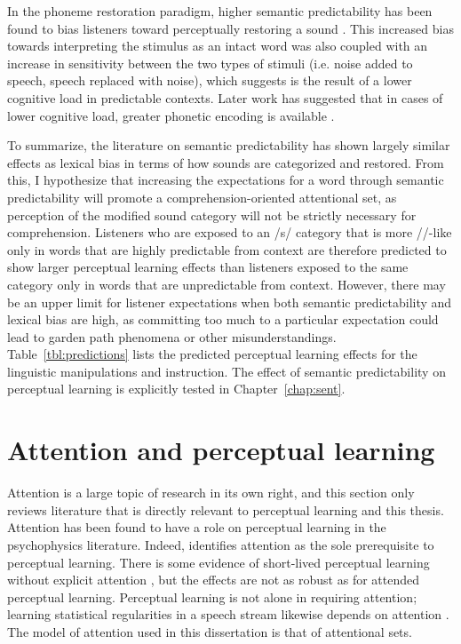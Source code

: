 In the phoneme restoration paradigm, higher semantic predictability has been found to bias listeners toward perceptually restoring a sound \citep{Samuel1981}.
This increased bias towards interpreting the stimulus as an intact word was also coupled with an increase in sensitivity between the two types of stimuli (i.e. noise added to speech, speech replaced with noise), which \citet{Samuel1981} suggests is the result of a lower cognitive load in predictable contexts. Later work has suggested that in cases of lower cognitive load, greater phonetic encoding is available \citep[see also][]{Mattys2011}.

To summarize, the literature on semantic predictability has shown largely similar effects as lexical bias in terms of how sounds are categorized and restored.  
From this, I hypothesize that increasing the expectations for a word through semantic predictability will promote a comprehension-oriented attentional set, as perception of the modified sound category will not be strictly necessary for comprehension.
Listeners who are exposed to an /s/ category that is more /\textesh/-like only in words that are highly predictable from context are therefore predicted to show larger perceptual learning effects than listeners exposed to the same category only in words that are unpredictable from context.
However, there may be an upper limit for listener expectations when both semantic predictability and lexical bias are high, as committing too much to a particular expectation could lead to garden path phenomena \citep{Levy2008} or other misunderstandings.
Table~\ref{tbl:predictions} lists the predicted perceptual learning effects for the linguistic manipulations and instruction.
The effect of semantic predictability on perceptual learning is explicitly tested in Chapter~\ref{chap:sent}.


\section{Attention and perceptual learning}
\label{sec:attention}

Attention is a large topic of research in its own right, and this section only reviews literature that is directly relevant to perceptual learning and this thesis.
Attention has been found to have a role on perceptual learning in the psychophysics literature. 
Indeed, \citet{Gibson1953} identifies attention as the sole prerequisite to perceptual learning.
There is some evidence of short-lived perceptual learning without explicit attention \citep{Watanabe2001}, but the effects are not as robust as for attended perceptual learning.
Perceptual learning is not alone in requiring attention; learning statistical regularities in a speech stream likewise depends on attention \citep{Toro2005}.
The model of attention used in this dissertation is that of attentional sets.

